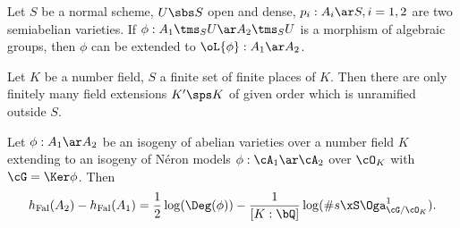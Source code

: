 \documentclass[a4paper, twoside]{article}
\begin{document}
\begin{thm}
	Let $S$ be a normal scheme, $U\sbs S$ open and dense, $p_{i}:A_{i}\ar S, i=1,2$ are two semiabelian varieties. If $\phi:A_{1}\tms_{S}U\ar A_{2}\tms_{S}U$ is a morphism of algebraic groups, then $\phi$ can be extended to $\oL{\phi}:A_{1}\ar A_{2}$.
\end{thm}



\begin{thm}
	Let $K$ be a number field, $S$ a finite set of finite places of $K$. Then there are only finitely many field extensions $K'\sps K$ of given order which is unramified outside $S$.
\end{thm}

\begin{thm}
	Let $\phi:A_{1}\ar A_{2}$ be an isogeny of abelian varieties over a number field $K$ extending to an isogeny of N{\'e}ron models $\phi:\cA_{1}\ar\cA_{2}$ over $\cO_{K}$ with $\cG=\Ker\phi$. Then
	\[
		h_{\text{Fal}}(A_{2})-h_{\text{Fal}}(A_{1})=\frac{1}{2}\log(\Deg(\phi))-\frac{1}{[K:\bQ]}\log(\# s\xS\Oga_{\cG/\cO_{K}}^{1}).
	\]
\end{thm}
\end{document}
